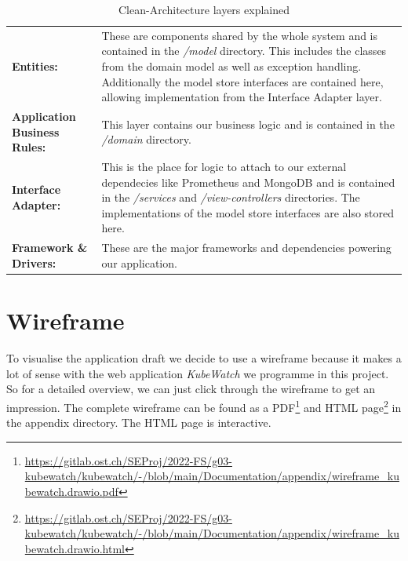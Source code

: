 \begin{table}[H]
  \begin{tabular*}{\textwidth}{p{3cm} | p{11cm}}
    \textbf{Entities:}
      & These are components shared by the whole system and is contained in the \textit{/model} directory. This includes the classes from the domain model as well as exception handling. Additionally the model store interfaces are contained here, allowing implementation from the Interface Adapter layer. \bigskip \\
    \textbf{Application Business Rules:}
      & This layer contains our business logic and is contained in the \textit{/domain} directory. \bigskip \\
    \textbf{Interface Adapter:}
      & This is the place for logic to attach to our external dependecies like Prometheus and MongoDB and is contained in the \textit{/services} and \textit{/view-controllers} directories. The implementations of the model store interfaces are also stored here. \bigskip \\
    \textbf{Framework \& Drivers:}
      & These are the major frameworks and dependencies powering our application. \\
  \end{tabular*}
  \caption{Clean-Architecture layers explained}
  \label{tab:clean-architecture-layers-explained}
\end{table}

\section{Wireframe}

To visualise the application draft we decide to use a wireframe because it makes a lot of sense with the web application \textit{KubeWatch} we programme in this project. So for a detailed overview, we can just click through the wireframe to get an impression. The complete wireframe can be found as a PDF\footnote{\url{https://gitlab.ost.ch/SEProj/2022-FS/g03-kubewatch/kubewatch/-/blob/main/Documentation/appendix/wireframe_kubewatch.drawio.pdf}} and HTML page\footnote{\url{https://gitlab.ost.ch/SEProj/2022-FS/g03-kubewatch/kubewatch/-/blob/main/Documentation/appendix/wireframe_kubewatch.drawio.html}} in the appendix directory.
The HTML page is interactive.
